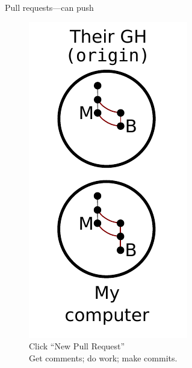 \begin{frame}{Pull requests---can push}
  \begin{figure}
    \includegraphics{push_009.pdf}
    \\ Click ``New Pull Request''
    \\ Get comments; do work; make commits.
  \end{figure}
\end{frame}

